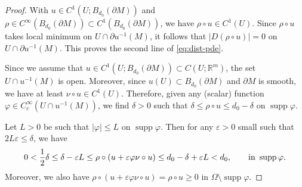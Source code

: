\documentclass[10pt,a4paper]{amsart}
\newcommand{\R}{{\mathbb R}}
\newcommand{\e}{\varepsilon}
\newcommand{\supp}{\operatorname{supp}}
\newcommand{\vp}{\varphi}
\begin{document}
\begin{proof}
With $u\in C^1(U;{B_{d_0}(\partial M)})$ and $\rho\in C^\infty({B_{d_0}(\partial M)})\subset C^1({B_{d_0}(\partial M)})$, we have $\rho\circ u \in C^1(U)$. 
Since $\rho\circ u$ takes local minimum on $U\cap\partial u^{-1}(M)$, it follows that $|D(\rho\circ u)| = 0$ on $U\cap\partial u^{-1}(M)$. This proves the second line of \eqref{eq:dist-pde}. 

Since we assume that $u\in C^1(U;B_{d_0}(\partial M))\subset C(U;\R^m)$, the set $U\cap u^{-1}(M)$ is open. Moreover, since $u(U)\subset B_{d_0}(\partial M)$ and $\partial M$ is smooth, we have at least $\nu\circ u\in C^1(U)$. Therefore, given any (scalar)  function $\vp \in C_c^\infty(U\cap u^{-1}(M))$, we find $\delta > 0$ such that $\delta \leq \rho\circ u\leq d_0- \delta$ on $\supp\vp$.

Let $L > 0$ be such that $|\vp|\leq L$ on $\supp\vp$. Then for any $\e > 0$ small such that $2L\e \leq \delta$, we have 
$$0 <  \frac{1}{2}\delta  \leq \delta - \e L \leq  \rho \circ (u + \e \vp \nu\circ u)    
\leq d_0 - \delta + \e L < d_0, \qquad \hbox{in } \supp\vp.$$ 
Moreover, we also have $\rho\circ (u + \e \vp\nu\circ u) = \rho\circ u \geq 0$ in $\Omega\setminus\supp\vp$.





\end{proof}
\end{document}
